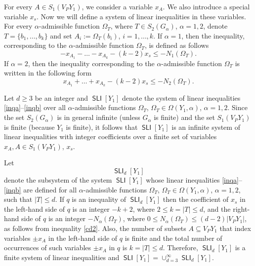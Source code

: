\documentclass[10pt, reqno]{amsart}
\numberwithin{equation}{section}
\begin{document}
For every $A \in S_1(V_P Y_1)$,
we consider a variable $x_A$. We also introduce a special variable $x_s$. Now we will define a system of linear inequalities in these variables.
For every ${\alpha}$-admissible function $\Omega_T$,   where $ T \in S_2(G_{\alpha})$, ${\alpha} =1,2$,  denote $T = \{ b_1, \dots, b_{k} \}$ and set $A_i := {\Omega}_T(b_i)$, $i=1, \dots, k$. If ${\alpha} =1$, then the inequality,  corresponding to the  ${\alpha}$-admissible  function $\Omega_T$, is defined as follows
\begin{equation}\label{inqa}
- x_{A_1} -\dots  - x_{A_{k}}  - (k-2)x_s \le   - N_1(\Omega_T)   .
\end{equation}
If ${\alpha} =2$, then the inequality  corresponding to the  ${\alpha}$-admissible  function $\Omega_T$ is written in the following form
\begin{equation}\label{inqb}
 x_{A_1} +\dots  + x_{A_{k}}  - (k-2)x_s \le   - N_2(\Omega_T)   .
\end{equation}

Let  $d \ge 3$ be an integer and  $\operatorname{\textsf{SLI}}[Y_1]$ denote  the system of linear inequalities \eqref{inqa}--\eqref{inqb} over all ${\alpha}$-admissible functions $\Omega_T$, $\Omega_T \in \Omega(Y_1, {\alpha})$,  ${\alpha} =1,2$. Since the set $S_2(G_{\alpha})$ is in general infinite (unless $G_{\alpha}$ is finite) and the set $S_1(V_P Y_1)$  is finite  (because $Y_1$ is finite),  it follows that  $\operatorname{\textsf{SLI}}[Y_1]$ is an infinite system  of linear inequalities with integer coefficients over a finite set of variables $x_A, A \in S_1(V_P Y_1)$, $x_s$.

Let
\begin{equation}\label{slid}
\operatorname{\textsf{SLI}}_d[Y_1]
\end{equation}
denote  the subsystem of the system $\operatorname{\textsf{SLI}}[Y_1]$  whose  linear inequalities \eqref{inqa}--\eqref{inqb} are defined for all ${\alpha}$-admissible functions $\Omega_T$,  $\Omega_T \in \Omega(Y_1, {\alpha})$,  ${\alpha} =1,2$, such that $|T| \le d$. If $q$ is an inequality of $\operatorname{\textsf{SLI}}_d[Y_1]$
then the coefficient of $x_s$ in the  left-hand side of $q$ is an integer $-k+2$, where $2 \le k = |T| \le d$, and the right-hand side of $q$ is an  integer $-N_{\alpha}({\Omega}_T)$, where    $0 \le N_{\alpha}({\Omega}_T) \le (d-2) | V_P Y_1 |$, as follows from inequality \eqref{cd2}. Also, the number of subsets $A \subseteq V_P Y_1$ that  index variables $\pm  x_A$  in the  left-hand side of $q$  is finite and the total number of occurrences of such variables $\pm  x_A$
in $q$ is $k = |T| \le d$.
Therefore, $\operatorname{\textsf{SLI}}_d[Y_1]$ is a finite system of linear inequalities and
$\operatorname{\textsf{SLI}}[Y_1] = \cup_{d=3}^{\infty}  \operatorname{\textsf{SLI}}_d[Y_1]$.
\medskip
\end{document}

